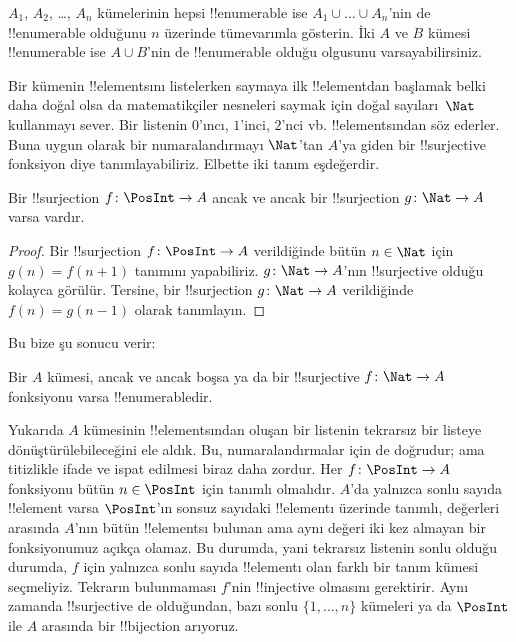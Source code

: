 \documentclass[../../../include/open-logic-section]{subfiles}
\begin{document}
\begin{prob}
  $A_1$, $A_2$, \dots, $A_n$ kümelerinin hepsi !!{enumerable} ise $A_1 \cup
  \dots \cup A_n$'nin de !!{enumerable} olduğunu $n$ üzerinde tümevarımla
  gösterin. İki $A$ ve $B$ kümesi !!{enumerable} ise $A \cup B$'nin de
  !!{enumerable} olduğu olgusunu varsayabilirsiniz.
\end{prob}

Bir kümenin !!{element}s{}ını listelerken saymaya ilk !!{element}{}dan başlamak
belki daha doğal olsa da matematikçiler nesneleri saymak için doğal
sayıları~$\Nat$ kullanmayı sever. Bir listenin $0$'ıncı, $1$'inci, $2$'nci
vb. !!{element}s{}ından söz ederler. Buna uygun olarak bir numaralandırmayı
$\Nat$'tan $A$'ya giden bir !!{surjective} fonksiyon diye tanımlayabiliriz.
Elbette iki tanım eşdeğerdir.

\begin{prop}
  Bir !!{surjection} $f\colon \PosInt \to A$ ancak ve ancak bir
  !!{surjection} $g\colon \Nat \to A$ varsa vardır.
\end{prop}

\begin{proof}
  Bir !!{surjection} $f\colon \PosInt \to A$ verildiğinde bütün $n \in
  \Nat$ için $g(n)=f(n+1)$ tanımını yapabiliriz. $g\colon \Nat \to A$'nın
  !!{surjective} olduğu kolayca görülür. Tersine, bir !!{surjection}
  $g\colon \Nat \to A$ verildiğinde $f(n)=g(n-1)$ olarak tanımlayın.
\end{proof}

Bu bize şu sonucu verir:

\begin{cor}
Bir $A$ kümesi, ancak ve ancak boşsa ya da bir !!{surjective} $f\colon \Nat
\to A$ fonksiyonu varsa !!{enumerable}{}dir.
\end{cor}

Yukarıda $A$ kümesinin !!{element}s{}ından oluşan bir listenin tekrarsız bir listeye
dönüştürülebileceğini ele aldık. Bu, numaralandırmalar için de doğrudur; ama
titizlikle ifade ve ispat edilmesi biraz daha zordur. Her $f\colon \PosInt
\to A$ fonksiyonu bütün $n \in \PosInt$ için tanımlı olmalıdır. $A$'da
yalnızca sonlu sayıda !!{element} varsa $\PosInt$'ın sonsuz sayıdaki
!!{element}{}ı üzerinde tanımlı, değerleri arasında $A$'nın bütün
!!{element}s{}ı bulunan ama aynı değeri iki kez almayan bir fonksiyonumuz
açıkça olamaz. Bu durumda, yani tekrarsız listenin sonlu olduğu durumda,
$f$ için yalnızca sonlu sayıda !!{element}{}ı olan farklı bir tanım kümesi
seçmeliyiz. Tekrarın bulunmaması $f$'nin !!{injective} olmasını gerektirir.
Aynı zamanda !!{surjective} de olduğundan, bazı sonlu $\{1, \dots, n\}$
kümeleri ya da $\PosInt$ ile $A$ arasında bir !!{bijection} arıyoruz.
\end{document}
